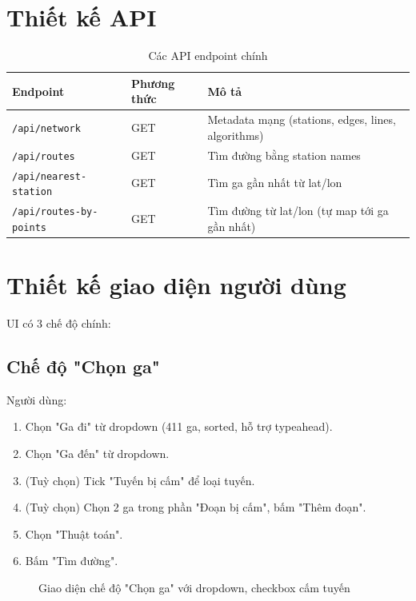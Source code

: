 \section{Thiết kế API}

\begin{table}[H]
  \centering
  \caption{Các API endpoint chính}
  \label{tab:api}
  \begin{tabular}{lll}
    \toprule
    \textbf{Endpoint} & \textbf{Phương thức} & \textbf{Mô tả} \\
    \midrule
    \texttt{/api/network} & GET & Metadata mạng (stations, edges, lines, algorithms) \\
    \texttt{/api/routes} & GET & Tìm đường bằng station names \\
    \texttt{/api/nearest-station} & GET & Tìm ga gần nhất từ lat/lon \\
    \texttt{/api/routes-by-points} & GET & Tìm đường từ lat/lon (tự map tới ga gần nhất) \\
    \bottomrule
  \end{tabular}
\end{table}

\section{Thiết kế giao diện người dùng}

UI có 3 chế độ chính:

\subsection{Chế độ "Chọn ga"}

Người dùng:
\begin{enumerate}
  \item Chọn "Ga đi" từ dropdown (411 ga, sorted, hỗ trợ typeahead).
  \item Chọn "Ga đến" từ dropdown.
  \item (Tuỳ chọn) Tick "Tuyến bị cấm" để loại tuyến.
  \item (Tuỳ chọn) Chọn 2 ga trong phần "Đoạn bị cấm", bấm "Thêm đoạn".
  \item Chọn "Thuật toán".
  \item Bấm "Tìm đường".
\end{enumerate}

\begin{figure}[H]
  \centering
  \caption{Giao diện chế độ "Chọn ga" với dropdown, checkbox cấm tuyến}
  \label{fig:ui-station}
\end{figure}

